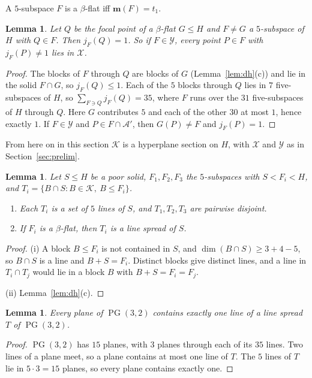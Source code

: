 \documentclass[11pt]{amsart}
\newtheorem{lemma}[theorem]{Lemma}
\theoremstyle{definition}
\newcommand{\K}{\mathcal{K}}
\newcommand{\X}{\mathcal{X}}
\newcommand{\Y}{\mathcal{Y}}
\newcommand{\A}{\mathcal{A}}
\newcommand{\PG}{\operatorname{PG}}
\begin{document}
A $5$-subspace $F$ is a $\beta$-flat iff $\mathbf m(F)=t_1$.

\begin{lemma}\label{lem:focal}
Let $Q$ be the focal point of a $\beta$-flat $G\le H$ and $F\ne G$ a $5$-subspace of $H$ with $Q\in F$. Then $j_F(Q)=1$. So if $F\in\Y$, every point $P\in F$ with $j_F(P)\ne1$ lies in $\X$.
\end{lemma}
\begin{proof}
The blocks of $F$ through $Q$ are blocks of $G$ (Lemma~\ref{lem:dh}(c)) and lie in the solid $F\cap G$, so $j_F(Q)\le1$. Each of the $5$ blocks through $Q$ lies in $7$ five-subspaces of $H$, so $\sum_{F\ni Q}j_F(Q)=35$, where $F$ runs over the $31$ five-subspaces of $H$ through $Q$. Here $G$ contributes $5$ and each of the other $30$ at most $1$, hence exactly $1$. If $F\in\Y$ and $P\in F\cap\A'$, then $G(P)\ne F$ and $j_F(P)=1$.
\end{proof}

From here on in this section $\K$ is a hyperplane section on $H$, with $\X$ and $\Y$ as in Section~\ref{sec:prelim}.

\begin{lemma}\label{lem:forced}
Let $S\le H$ be a poor solid, $F_1,F_2,F_3$ the $5$-subspaces with $S<F_i<H$, and $T_i=\{B\cap S: B\in\K,\ B\le F_i\}$.
\begin{enumerate}[label=(\roman*)]
\item Each $T_i$ is a set of $5$ lines of $S$, and $T_1,T_2,T_3$ are pairwise disjoint.
\item If $F_i$ is a $\beta$-flat, then $T_i$ is a line spread of $S$.
\end{enumerate}
\end{lemma}
\begin{proof}
(i) A block $B\le F_i$ is not contained in $S$, and $\dim(B\cap S)\ge3+4-5$, so $B\cap S$ is a line and $B+S=F_i$. Distinct blocks give distinct lines, and a line in $T_i\cap T_j$ would lie in a block $B$ with $B+S=F_i=F_j$.

(ii) Lemma~\ref{lem:dh}(c).
\end{proof}

\begin{lemma}\label{lem:spreadplane}
Every plane of $\PG(3,2)$ contains exactly one line of a line spread $T$ of $\PG(3,2)$.
\end{lemma}
\begin{proof}
$\PG(3,2)$ has $15$ planes, with $3$ planes through each of its $35$ lines. Two lines of a plane meet, so a plane contains at most one line of $T$. The $5$ lines of $T$ lie in $5\cdot3=15$ planes, so every plane contains exactly one.
\end{proof}
\end{document}
